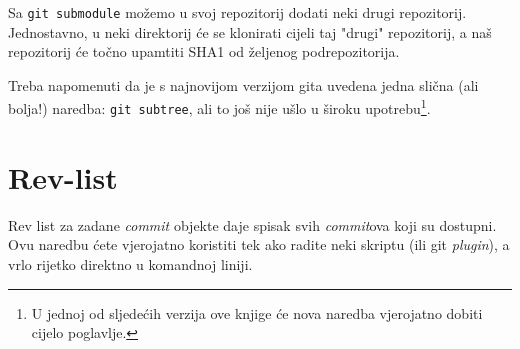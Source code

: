 Sa \verb+git submodule+ možemo u svoj repozitorij dodati neki drugi repozitorij. 
Jednostavno, u neki direktorij će se klonirati cijeli taj "drugi" repozitorij, a naš repozitorij će točno upamtiti SHA1 od željenog podrepozitorija.

Treba napomenuti da je s najnovijom verzijom gita uvedena jedna slična (ali bolja!) naredba: \verb+git subtree+, ali to još nije ušlo u široku upotrebu\footnote{U jednoj od sljedećih verzija ove knjige će nova naredba vjerojatno dobiti cijelo poglavlje.}.

\section*{Rev-list}

Rev list za zadane \emph{commit} objekte daje spisak svih \emph{commit}ova koji su dostupni.
Ovu naredbu ćete vjerojatno koristiti tek ako radite neki skriptu (ili git \emph{plugin}), a vrlo rijetko direktno u komandnoj liniji.

